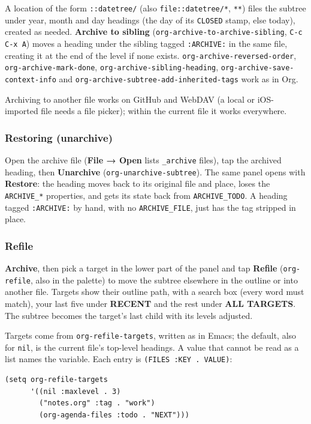 \documentclass[11pt]{article}
\begin{document}
A location of the form \texttt{::datetree/} (also \texttt{file::datetree/*}, \texttt{**}) files the subtree under year, month and day headings (the day of its \texttt{CLOSED} stamp, else today), created as needed. \textbf{Archive to sibling} (\texttt{org-archive-to-archive-sibling}, \texttt{C-c C-x A}) moves a heading under the sibling tagged \texttt{:ARCHIVE:} in the same file, creating it at the end of the level if none exists. \texttt{org-archive-reversed-order}, \texttt{org-archive-mark-done}, \texttt{org-archive-sibling-heading}, \texttt{org-archive-save-context-info} and \texttt{org-archive-subtree-add-inherited-tags} work as in Org.

Archiving to another file works on GitHub and WebDAV (a local or iOS-imported file needs a file picker); within the current file it works everywhere.

\subsubsection{Restoring (unarchive)}
\label{sec:org6f3a4bd}
Open the archive file (\textbf{File → Open} lists \texttt{\_archive} files), tap the archived heading, then \textbf{Unarchive} (\texttt{org-unarchive-subtree}). The same panel opens with \textbf{Restore}: the heading moves back to its original file and place, loses the \texttt{ARCHIVE\_*} properties, and gets its state back from \texttt{ARCHIVE\_TODO}. A heading tagged \texttt{:ARCHIVE:} by hand, with no \texttt{ARCHIVE\_FILE}, just has the tag stripped in place.

\subsubsection{Refile}
\label{sec:orgf424d46}
\textbf{Archive}, then pick a target in the lower part of the panel and tap \textbf{Refile} (\texttt{org-refile}, also in the palette) to move the subtree elsewhere in the outline or into another file. Targets show their outline path, with a search box (every word must match), your last five under \textbf{RECENT} and the rest under \textbf{ALL TARGETS}. The subtree becomes the target's last child with its levels adjusted.

Targets come from \texttt{org-refile-targets}, written as in Emacs; the default, also for \texttt{nil}, is the current file's top-level headings. A value that cannot be read as a list names the variable. Each entry is \texttt{(FILES :KEY . VALUE)}:

\begin{verbatim}
(setq org-refile-targets
      '((nil :maxlevel . 3)
        ("notes.org" :tag . "work")
        (org-agenda-files :todo . "NEXT")))
\end{verbatim}
\end{document}
